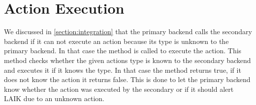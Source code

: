 \section{Action Execution}

We discussed in \autoref{section:integration} that the primary backend calls the secondary backend if it can not execute an action because its type is unknown to the primary backend.
In that case the method  is called to execute the action.
This method checks whether the given actions type is known to the secondary backend and executes it if it knows the type.
In that case the method returns true, if it does not know the action it returns false.
This is done to let the primary backend know whether the action was executed by the secondary or if it should alert LAIK due to an unknown action.